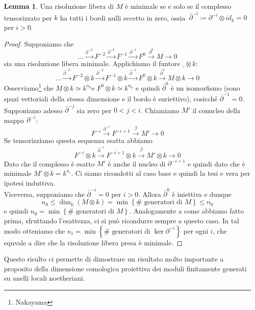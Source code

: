 \documentclass[a4paper,11pt,oneside]{book}
\newcommand{\set}[1]{\left\{ #1 \right\}}
\theoremstyle{definition}
\newtheorem{lemma}{Lemma}
\begin{document}
  \begin{lemma}\label{bordinulli}
   Una risoluzione libera di $M$ \`e minimale se e solo se il complesso tensorizzato per $k$ ha tutti i bordi nulli eccetto in zero, ossia  
   $\ \bar\partial^{-i}\coloneqq \partial^{-i}\otimes id_k=0 $ per $i> 0$.
  \end{lemma}
  \begin{proof}
   Supponiamo che
   \[
    \dots\xrightarrow{\partial^{-3}} F^{-2}\xrightarrow{\partial^{-2}} F^{-1}\xrightarrow{\partial^{-1}}F^0\xrightarrow{\partial^{0}} M\rightarrow 0
  \]
  sia una risoluzione libera minimale. Applichiamo il funtore $\_\otimes k$:
  \[
    \dots\xrightarrow{\bar\partial^{-3}} F^{-2}\otimes k\xrightarrow{\bar\partial^{-2}} F^{-1}\otimes k
    \xrightarrow{\bar\partial^{-1}}F^0\otimes k\xrightarrow{\bar\partial^{0}} M\otimes k\rightarrow 0
  \]
  Osserviamo\footnote{Nakayama} che  $M\otimes k\simeq k^{n_0}$e $F^0\otimes k\simeq k^{n_0}$ e quindi $\bar\partial^{0}$ \`e un isomorfismo (sono spazi vettoriali della stessa dimensione
  e il bordo \`e suriettivo), cosicché $\bar\partial^{-1}=0$.\\
  Supponiamo adesso $\bar\partial^{-j}$ sia zero per $0<j<i$. Chiamiamo $M'$ il conucleo della mappa $\partial^{-i}$: 
  \[
   F^{-i}\xrightarrow{\partial^{-i}}F^{-i+1}\xrightarrow{\beta} M'\rightarrow 0
  \]
  Se tensorizziamo questa sequenza esatta abbiamo
  \[
   F^{-i}\otimes k\xrightarrow{\bar\partial^{-i}}F^{-i+1}\otimes k\xrightarrow{\bar\beta} M'\otimes k\rightarrow 0
  \]
  Dato che il complesso \`e esatto $M'$ \`e anche il nucleo di $\partial^{-i+1}$ e quindi dato che \`e minimale $M'\otimes k=k^{n_i}$.
  Ci siamo ricondotti al caso base e quindi la tesi e vera per ipotesi induttiva.\\
  Viceversa, supponiamo che $\bar\partial^{-i}=0 $ per $i> 0$. Allora $\bar\partial^0$ \`e iniettiva e dunque
  \[
   n_0\leq\dim_k  (M\otimes k)=\min\set{\#\text{ generatori di }M}\leq n_0
  \]
  e quindi $n_0=\min\set{\#\text{ generatori di }M}$. Analogamente a come abbiamo fatto prima, sfruttando l'esattezza, ci si pu\`o 
  ricondurre sempre a questo caso. In tal modo otteniamo che  $n_i=\min\set{\#\text{ generatori di }\ker\partial^{-i}}$ per ogni $i$, che equvale a dire che la risoluzione libera 
  presa \`e minimale.
  \end{proof}
  
  Questo risulto ci permette di dimostrare un risultato molto importante a proposito della dimensione comologica proiettiva dei moduli finitamente generati su anelli 
  locali noetheriani.
  
\end{document}
